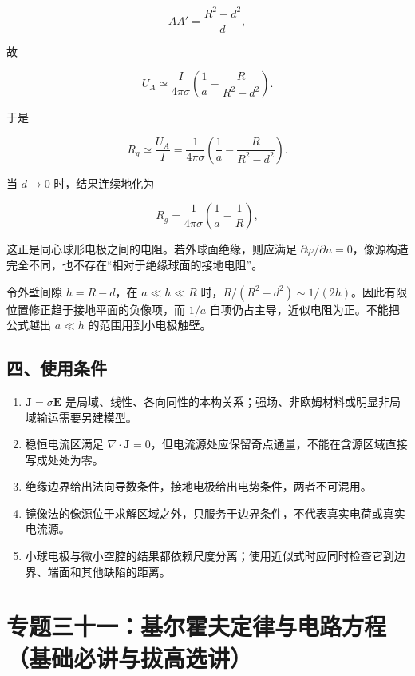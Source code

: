 \[
AA'=\frac{R^2-d^2}{d},
\]

故

\[
U_A\simeq\frac{I}{4\pi\sigma}
\left(
\frac1a-\frac{R}{R^2-d^2}
\right)
.
\]

于是

\[
\boxed{
R_g\simeq\frac{U_A}{I}
=\frac{1}{4\pi\sigma}
\left(
\frac1a-\frac{R}{R^2-d^2}
\right)
}.
\]

当 \(d\to0\) 时，结果连续地化为

\[
R_g=\frac{1}{4\pi\sigma}
\left(\frac1a-\frac1R\right),
\]

这正是同心球形电极之间的电阻。若外球面绝缘，则应满足
\(\partial\varphi/\partial n=0\)，像源构造完全不同，也不存在``相对于绝缘球面的接地电阻''。

令外壁间隙 \(h=R-d\)，在 \(a\ll h\ll R\)
时，\(R/(R^2-d^2)\sim1/(2h)\)。因此有限位置修正趋于接地平面的负像项，而
\(1/a\) 自项仍占主导，近似电阻为正。不能把公式越出 \(a\ll h\)
的范围用到小电极触壁。

\subsection{四、使用条件}\label{m4:ux56dbux4f7fux7528ux6761ux4ef6}

\begin{enumerate}
\def\labelenumi{\arabic{enumi}.}
\tightlist
\item
  \(\mathbf J=\sigma\mathbf E\)
  是局域、线性、各向同性的本构关系；强场、非欧姆材料或明显非局域输运需要另建模型。
\item
  稳恒电流区满足
  \(\nabla\cdot\mathbf J=0\)，但电流源处应保留奇点通量，不能在含源区域直接写成处处为零。
\item
  绝缘边界给出法向导数条件，接地电极给出电势条件，两者不可混用。
\item
  镜像法的像源位于求解区域之外，只服务于边界条件，不代表真实电荷或真实电流源。
\item
  小球电极与微小空腔的结果都依赖尺度分离；使用近似式时应同时检查它到边界、端面和其他缺陷的距离。
\end{enumerate}

\section{专题三十一：基尔霍夫定律与电路方程（基础必讲与拔高选讲）}\label{m4:ux4e13ux9898ux4e09ux5341ux4e00ux57faux5c14ux970dux592bux5b9aux5f8bux4e0eux7535ux8defux65b9ux7a0bux57faux7840ux5fc5ux8bb2ux4e0eux62d4ux9ad8ux9009ux8bb2}

